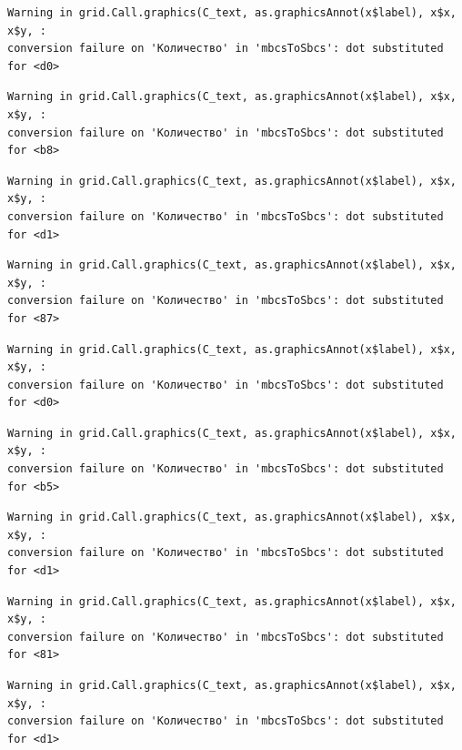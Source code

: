 \documentclass[
  letterpaper,
]{scrbook}
\theoremstyle{definition}
\theoremstyle{remark}
\begin{document}
\begin{verbatim}
Warning in grid.Call.graphics(C_text, as.graphicsAnnot(x$label), x$x, x$y, :
conversion failure on 'Количество' in 'mbcsToSbcs': dot substituted for <d0>
\end{verbatim}

\begin{verbatim}
Warning in grid.Call.graphics(C_text, as.graphicsAnnot(x$label), x$x, x$y, :
conversion failure on 'Количество' in 'mbcsToSbcs': dot substituted for <b8>
\end{verbatim}

\begin{verbatim}
Warning in grid.Call.graphics(C_text, as.graphicsAnnot(x$label), x$x, x$y, :
conversion failure on 'Количество' in 'mbcsToSbcs': dot substituted for <d1>
\end{verbatim}

\begin{verbatim}
Warning in grid.Call.graphics(C_text, as.graphicsAnnot(x$label), x$x, x$y, :
conversion failure on 'Количество' in 'mbcsToSbcs': dot substituted for <87>
\end{verbatim}

\begin{verbatim}
Warning in grid.Call.graphics(C_text, as.graphicsAnnot(x$label), x$x, x$y, :
conversion failure on 'Количество' in 'mbcsToSbcs': dot substituted for <d0>
\end{verbatim}

\begin{verbatim}
Warning in grid.Call.graphics(C_text, as.graphicsAnnot(x$label), x$x, x$y, :
conversion failure on 'Количество' in 'mbcsToSbcs': dot substituted for <b5>
\end{verbatim}

\begin{verbatim}
Warning in grid.Call.graphics(C_text, as.graphicsAnnot(x$label), x$x, x$y, :
conversion failure on 'Количество' in 'mbcsToSbcs': dot substituted for <d1>
\end{verbatim}

\begin{verbatim}
Warning in grid.Call.graphics(C_text, as.graphicsAnnot(x$label), x$x, x$y, :
conversion failure on 'Количество' in 'mbcsToSbcs': dot substituted for <81>
\end{verbatim}

\begin{verbatim}
Warning in grid.Call.graphics(C_text, as.graphicsAnnot(x$label), x$x, x$y, :
conversion failure on 'Количество' in 'mbcsToSbcs': dot substituted for <d1>
\end{verbatim}
\end{document}
